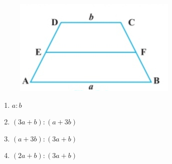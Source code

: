 \documentclass{article}
\begin{document}
\begin{enumerate}[label=\thesection.\arabic*,ref=\thesection.\theenumi]
\begin{figure}[!h]
\begin{center}
\includegraphics[width=\columnwidth]{exemplar/9.9.1/figs/six.jpg}
\end{center}
\caption{}
\label{fig:exemplar/9.9.1Figure 4}
\end{figure}
\begin{enumerate}
\item $a:b$ 
\item $(3a+b):(a+3b)$  
\item $(a+3b):(3a+b)$
\item $(2a+b):(3a+b)$
\end{enumerate}
\end{enumerate}
\end{document}
